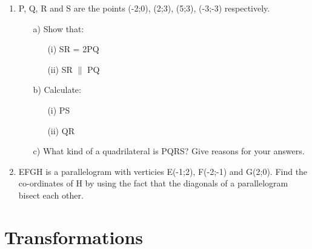 \documentclass[10pt,a4paper,titlepage,twoside,openright]{report}
\begin{document}
{\begin{enumerate}
{\begin{enumerate}
\item[a)] Show that:
\begin{enumerate}
\item[(i)] AD = BC
\item[(ii)] AB $\parallel$ DC
\end{enumerate}
\item[b)] What name would you give to ABCD?
\item[c)] Show that the diagonals AC and BD do not bisect each other.
\end{enumerate}
}
\item{P, Q, R and S are the points (-2;0), (2;3), (5;3), (-3;-3) respectively.
\begin{enumerate}
\item[a)] Show that:
\begin{enumerate}
\item[(i)] SR = 2PQ
\item[(ii)] SR $\parallel$ PQ
\end{enumerate}
\item[b)] Calculate:
\begin{enumerate}
\item[(i)] PS
\item[(ii)] QR
\end{enumerate}
\item[c)] What kind of a quadrilateral is PQRS? Give reasons for your answers.
\end{enumerate}}
\item{EFGH is a parallelogram with verticies E(-1;2), F(-2;-1) and G(2;0). Find the co-ordinates of H by using the fact that the diagonals of a parallelogram bisect each other.}
\end{enumerate}
}

\section{Transformations}
\end{document}
